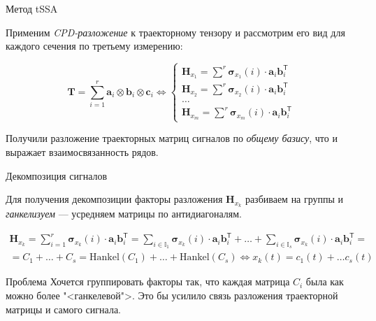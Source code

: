 	\begin{frame}{Метод tSSA}
		
		Применим \textit{CPD-разложение} к траекторному тензору и рассмотрим его вид для каждого сечения по третьему измерению:
		
		\begin{equation*}\label{eq:tSSA_decomp}
			\textbf{T} = \sum\limits_{i = 1}^{r} \mathbf{a}_i \otimes \mathbf{b}_i \otimes \mathbf{c}_i \Leftrightarrow \begin{cases}
				\mathbf{H}_{x_1} = \sum\limits^{r} \boldsymbol{\sigma}_{x_1}(i) \cdot \mathbf{a}_i  \mathbf{b}_i^{\mathsf{T}}  \\
				\mathbf{H}_{x_2} = \sum\limits^{r} \boldsymbol{\sigma}_{x_2}(i) \cdot \mathbf{a}_i  \mathbf{b}_i^{\mathsf{T}} \\
				\ldots \\
				\mathbf{H}_{x_m} = \sum\limits^{r} \boldsymbol{\sigma}_{x_m}(i) \cdot \mathbf{a}_i  \mathbf{b}_i^{\mathsf{T}} 
			\end{cases}
		\end{equation*}
		
		Получили разложение траекторных матриц сигналов по \emph{общему базису}, что и выражает взаимосвязанность рядов.
		
	\end{frame}
	
	\begin{frame}{Декомпозиция сигналов}
		
		Для получения декомпозиции факторы разложения $ \mathbf{H}_{x_k} $ разбиваем на группы и \emph{ганкелизуем} --- усредняем матрицы по антидиагоналям.
		
		\begin{multline*}
			\mathbf{H}_{x_k} = \sum\limits_{i = 1}^{r} \boldsymbol{\sigma}_{x_k}(i) \cdot \mathbf{a}_i  \mathbf{b}_i^{\mathsf{T}} = \sum\limits_{i \in \mathbb{I}_1} \boldsymbol{\sigma}_{x_k}(i) \cdot \mathbf{a}_i  \mathbf{b}_i^{\mathsf{T}} + \ldots + \sum\limits_{i \in \mathbb{I}_s} \boldsymbol{\sigma}_{x_k}(i) \cdot \mathbf{a}_i  \mathbf{b}_i^{\mathsf{T}} = \\ = C_1 + \ldots + C_s = \text{Hankel}(C_1) + \ldots + \text{Hankel}(C_s)  \Leftrightarrow x_k(t) = c_1(t) + \ldots c_s(t)
		\end{multline*}
		
		\begin{alertblock}{Проблема}
			Хочется группировать факторы так, что каждая матрица $ C_i $ была как можно более "<ганкелевой">. Это бы усилило связь разложения траекторной матрицы и самого сигнала.
		\end{alertblock}
		
	\end{frame}
	
